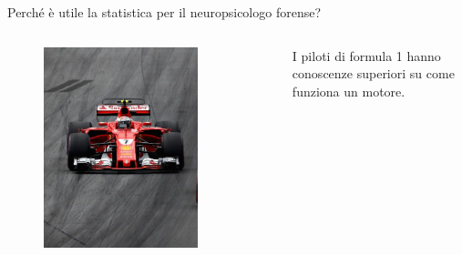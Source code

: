 \documentclass[
  ignorenonframetext,
]{beamer}
\begin{document}
\begin{frame}{Perché è utile la statistica per il neuropsicologo
forense?}
\begin{columns}
\begin{figure}
\includegraphics[width=0.8\textwidth]{Figures/F1.png}
\end{figure}
\tiny{I piloti di formula 1 hanno conoscenze superiori su come funziona un motore.}

\end{columns}
\end{frame}
\end{document}
